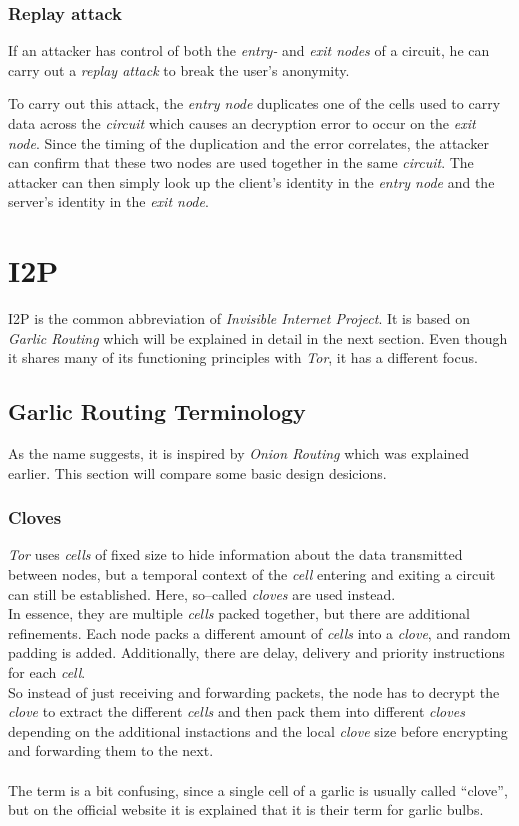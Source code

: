 \documentclass{sig-alternate}
\begin{document}
\subsubsection{Replay attack}
If an attacker has control of both the \emph{entry-} and \emph{exit nodes} of a circuit, he
can carry out a \emph{replay attack}\cite{pries2007} to break the user's anonymity.

To carry out this attack, the \emph{entry node} duplicates one of the cells used to carry data
across the \emph{circuit} which causes an decryption error to occur on the \emph{exit node}.
Since the timing of the duplication and the error correlates, the attacker can confirm that
these two nodes are used together in the same \emph{circuit}. The attacker can then simply
look up the client's identity in the \emph{entry node} and the server's identity in the
\emph{exit node}.

\section{I2P}
I2P is the common abbreviation of \emph{Invisible Internet Project}.
It is based on \emph{Garlic Routing} which will be explained in detail in the next section.
Even though it shares many of its functioning principles with \emph{Tor}, it has a different focus.

\subsection{Garlic Routing Terminology}
As the name suggests, it is inspired by \emph{Onion Routing} which was explained earlier.
This section will compare some basic design desicions.

\subsubsection{Cloves}
\emph{Tor} uses \emph{cells} of fixed size to hide information about the data transmitted between nodes, but a temporal context of the \emph{cell} entering and exiting a circuit can still be established.
Here, so--called \emph{cloves} are used instead.
\\
In essence, they are multiple \emph{cells} packed together, but there are additional refinements.
Each node packs a different amount of \emph{cells} into a \emph{clove}, and random padding is added.
Additionally, there are delay, delivery and priority instructions for each \emph{cell}.
\\
So instead of just receiving and forwarding packets, the node has to decrypt the \emph{clove} to extract the different \emph{cells} and then pack them into different \emph{cloves} depending on the additional instactions and the local \emph{clove} size before encrypting and forwarding them to the next\cite{zantout2011}.
\\
\\
The term is a bit confusing, since a single cell of a garlic is usually called ``clove'', but on the official website it is explained that it is their term for garlic bulbs\cite{garlic}.
\end{document}
